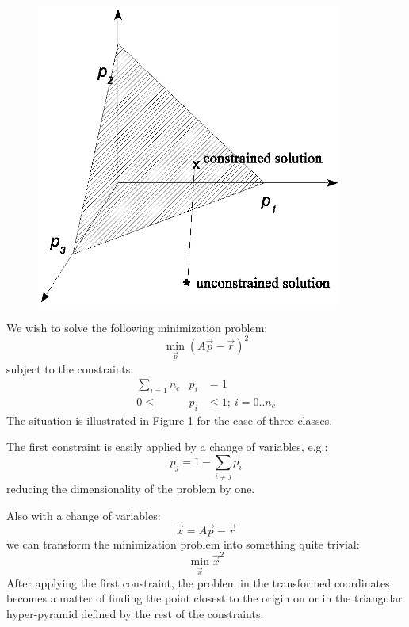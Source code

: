 \documentclass{article}
\begin{document}
\begin{figure}
\includegraphics[width=0.9\textwidth]{config1}
\label{fig1}
\end{figure}

We wish to solve the following minimization problem:
\begin{equation}
\underset{\vec p}{\min} (A \vec p - \vec r)^2 
\end{equation}
subject to the constraints:
\begin{eqnarray}
\sum_{i=1}{n_c} & p_i & = 1 \\
0 \le & p_i & \le 1; ~i=0..n_c
\end{eqnarray}
The situation is illustrated in Figure \ref{fig1} for the case of three classes.

The first constraint is easily applied by a change of variables, e.g.:
\begin{equation}
p_j=1-\sum_{i \ne j} p_i
\end{equation}
reducing the dimensionality of the problem by one. 

Also with a change of variables: 
\begin{equation}
\vec x = A \vec p - \vec r
\end{equation}
we can transform the minimization problem into
something quite trivial:
\begin{equation}
\underset{\vec x}{\min} {\vec x}^2
\label{trivial_min}
\end{equation}
After applying the first constraint, the problem in the transformed coordinates
becomes a matter of finding the point closest to the origin on or in the 
triangular hyper-pyramid defined by the rest of the constraints.
\end{document}

